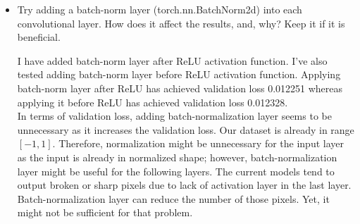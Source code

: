 \documentclass[12pt]{article}
\begin{document}
    \begin{itemize}
        \item Try adding a batch-norm layer (torch.nn.BatchNorm2d) into each convolutional layer. How does it affect the results, and, why? Keep it if it is beneficial. 

		\begin{minipage}{.95\textwidth}
			\begin{minipage}{.45\textwidth}
				\centering
				\captionsetup{width=1.\textwidth}
			 \end{minipage}
			 \hfill
			\begin{minipage}{0.45\textwidth}
				I have added batch-norm layer after ReLU activation function. I've also tested adding batch-norm layer before ReLU activation function. Applying batch-norm layer after ReLU has achieved validation loss 0.012251 whereas applying it before ReLU has achieved validation loss 0.012328. \\
		 In terms of validation loss, adding batch-normalization layer seems to be unnecessary as it increases the validation loss. Our dataset is already in range $[-1,1]$. Therefore, normalization might be unnecessary for the input layer as the input is already in normalized shape; however, batch-normalization layer might be useful for the following layers. The current models tend to output broken or sharp pixels due to lack of activation layer in the last layer. Batch-normalization layer can reduce the number of those pixels. Yet, it might not be sufficient for that problem.
			\end{minipage}
		\end{minipage} \\


\end{itemize}
\end{document}
